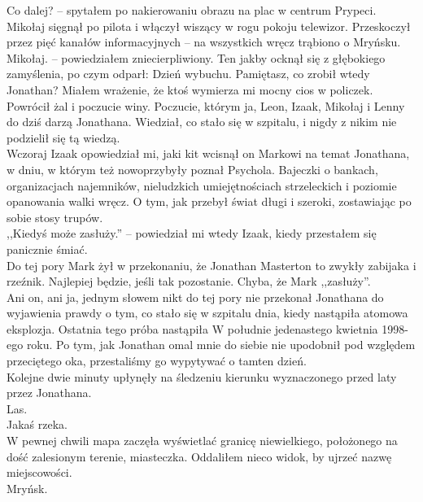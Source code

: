 \documentclass[../MAIN.tex]{subfiles}
\begin{document}
\sx Co dalej? -- spytałem po nakierowaniu obrazu na plac w centrum Prypeci.
\qd
Mikołaj sięgnął po pilota i włączył wiszący w rogu pokoju telewizor. Przeskoczył przez pięć kanałów informacyjnych -- na wszystkich wręcz trąbiono o Mryńsku.
\sx Mikołaj. -- powiedziałem zniecierpliwiony.
\qd
Ten jakby ocknął się z głębokiego zamyślenia, po czym odparł:
\sx Dzień wybuchu. Pamiętasz, co zrobił wtedy Jonathan?
\qd
Miałem wrażenie, że ktoś wymierza mi mocny cios w policzek. Powrócił żal i poczucie winy. Poczucie, którym ja, Leon, Izaak, Mikołaj i Lenny do dziś darzą Jonathana. Wiedział, co stało się w szpitalu, i nigdy z nikim nie podzielił się tą wiedzą.
\\
Wczoraj Izaak opowiedział mi, jaki kit wcisnął on Markowi na temat Jonathana, w dniu, w którym też nowoprzybyły poznał Psychola. Bajeczki o bankach, organizacjach najemników, nieludzkich umiejętnościach strzeleckich i poziomie opanowania walki wręcz. O tym, jak przebył świat długi i szeroki, zostawiając po sobie stosy trupów.
\\
,,Kiedyś może zasłuży.'' -- powiedział mi wtedy Izaak, kiedy przestałem się panicznie śmiać.
\\
Do tej pory Mark żył w przekonaniu, że Jonathan Masterton to zwykły zabijaka i rzeźnik. Najlepiej będzie, jeśli tak pozostanie. Chyba, że Mark ,,zasłuży''.
\\
Ani on, ani ja, jednym słowem nikt do tej pory nie przekonał Jonathana do wyjawienia prawdy o tym, co stało się w szpitalu dnia, kiedy nastąpiła atomowa eksplozja. Ostatnia tego próba nastąpiła W południe jedenastego kwietnia 1998-ego roku. Po tym, jak Jonathan omal mnie do siebie nie upodobnił pod względem przeciętego oka, przestaliśmy go wypytywać o tamten dzień.
\\
Kolejne dwie minuty upłynęły na śledzeniu kierunku wyznaczonego przed laty przez Jonathana.
\\
Las.
\\
Jakaś rzeka.
\\
W pewnej chwili mapa zaczęła wyświetlać granicę niewielkiego, położonego na dość zalesionym terenie, miasteczka. Oddaliłem nieco widok, by ujrzeć nazwę miejscowości.\\
Mryńsk.
\end{document}

